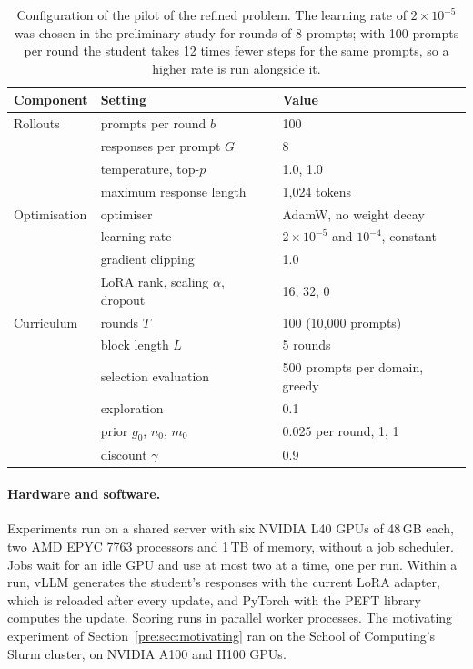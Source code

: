 \begin{table}[htbp]
\centering
\small
\begin{tabular}{@{}lll@{}}
\toprule
\textbf{Component} & \textbf{Setting} & \textbf{Value} \\
\midrule
Rollouts       & prompts per round $b$                    & 100 \\
               & responses per prompt $G$                 & 8 \\
               & temperature, top-$p$                     & 1.0, 1.0 \\
               & maximum response length                  & 1,024 tokens \\
Optimisation   & optimiser                                & AdamW, no weight decay \\
               & learning rate                            & $2 \times 10^{-5}$ and $10^{-4}$, constant \\
               & gradient clipping                        & 1.0 \\
               & LoRA rank, scaling $\alpha$, dropout     & 16, 32, 0 \\
Curriculum     & rounds $T$                               & 100 (10,000 prompts) \\
               & block length $L$                         & 5 rounds \\
               & selection evaluation                     & 500 prompts per domain, greedy \\
               & exploration                              & 0.1 \\
               & prior $g_0$, $n_0$, $m_0$                & 0.025 per round, 1, 1 \\
               & discount $\gamma$                        & 0.9 \\
\bottomrule
\end{tabular}
\caption{Configuration of the pilot of the refined problem. The learning rate of
$2 \times 10^{-5}$ was chosen in the preliminary study for rounds of 8 prompts; with 100
prompts per round the student takes 12 times fewer steps for the same prompts, so a
higher rate is run alongside it.}
\label{imp:tab:config}
\end{table}

\paragraph{Hardware and software.} Experiments run on a shared server with six NVIDIA
L40 GPUs of 48\,GB each, two AMD EPYC 7763 processors and 1\,TB of memory, without a job
scheduler. Jobs wait for an idle GPU and use at most two at a time, one per run. Within
a run, vLLM \autocite{kwon_vllm_2023} generates the student's responses with the current
LoRA adapter, which is reloaded after every update, and PyTorch with the PEFT library
computes the update. Scoring runs in parallel worker processes. The motivating
experiment of Section~\ref{pre:sec:motivating} ran on the School of Computing's Slurm
cluster, on NVIDIA A100 and H100 GPUs.

